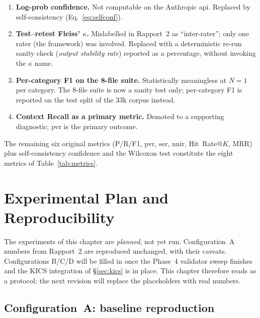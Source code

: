 \documentclass[12pt, a4paper]{report}
\begin{document}
\begin{enumerate}
  \item \textbf{Log-prob confidence.} Not computable on the
        Anthropic \gls{api}. Replaced by self-consistency
        (Eq.~\ref{eq:selfconf}).
  \item \textbf{Test--retest Fleiss' $\kappa$.} Mislabelled in Rapport~2
        as ``inter-rater''; only one rater (the framework) was involved.
        Replaced with a deterministic re-run sanity check
        (\emph{output stability rate}) reported as a percentage,
        without invoking the $\kappa$ name.
  \item \textbf{Per-category F1 on the 8-file suite.} Statistically
        meaningless at $N=1$ per category. The 8-file suite is now a
        sanity test only; per-category F1 is reported on the test split
        of the 33k corpus instead.
  \item \textbf{Context Recall as a primary metric.} Demoted to a
        supporting diagnostic; \gls{pvr} is the primary outcome.
\end{enumerate}

The remaining six original metrics (P/R/F1, \gls{pvr}, \gls{ser}, \gls{nnir},
Hit~Rate@$K$, MRR) plus self-consistency confidence and the Wilcoxon test
constitute the eight metrics of Table~\ref{tab:metrics}.

\chapter{Experimental Plan and Reproducibility}
\label{chap:results}

\begin{warningbox}
The experiments of this chapter are \emph{planned}, not yet run.
Configuration~A numbers from Rapport~2 are reproduced unchanged, with
their caveats. Configurations B/C/D will be filled in once the Phase~4
validator sweep finishes and the KICS integration of \S\ref{sec:kics} is
in place. This chapter therefore reads as a protocol; the next revision
will replace the placeholders with real numbers.
\end{warningbox}

\section{Configuration~A: baseline reproduction}
\end{document}
